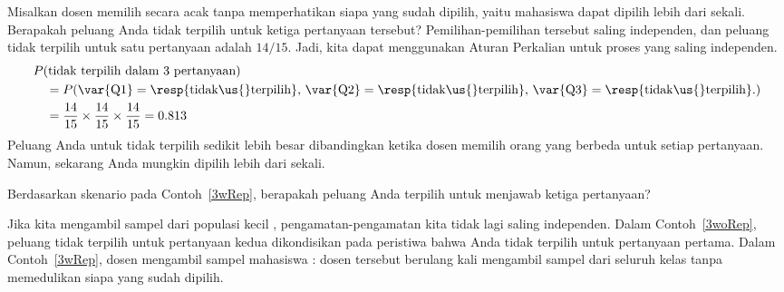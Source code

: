 \D{\newpage}

\begin{examplewrap}
\begin{nexample}{Misalkan dosen memilih secara acak tanpa memperhatikan siapa yang sudah dipilih, yaitu mahasiswa dapat dipilih lebih dari sekali. Berapakah peluang Anda tidak terpilih untuk ketiga pertanyaan tersebut?}\label{3wRep}
Pemilihan-pemilihan tersebut saling independen, dan peluang tidak terpilih untuk satu pertanyaan adalah $14/15$. Jadi, kita dapat menggunakan Aturan Perkalian untuk proses yang saling independen.
\begin{align*}
&P(\text{tidak terpilih dalam 3 pertanyaan}) \\
&\quad = P(\text{\var{Q1}} = \text{\resp{tidak\us{}terpilih}, }\text{\var{Q2}} = \text{\resp{tidak\us{}terpilih}, }\text{\var{Q3}} = \text{\resp{tidak\us{}terpilih}.}) \\
&\quad = \frac{14}{15}\times\frac{14}{15}\times\frac{14}{15} = 0.813
\end{align*}
Peluang Anda untuk tidak terpilih sedikit lebih besar dibandingkan ketika dosen memilih orang yang berbeda untuk setiap pertanyaan. Namun, sekarang Anda mungkin dipilih lebih dari sekali.
\end{nexample}
\end{examplewrap}

\begin{exercisewrap}
\begin{nexercise}
Berdasarkan skenario pada Contoh~\ref{3wRep}, berapakah peluang Anda terpilih untuk menjawab ketiga pertanyaan?\footnotemark
\end{nexercise}
\end{exercisewrap}

Jika kita mengambil sampel dari populasi kecil , pengamatan-pengamatan kita tidak lagi saling independen. Dalam Contoh~\ref{3woRep}, peluang tidak terpilih untuk pertanyaan kedua dikondisikan pada peristiwa bahwa Anda tidak terpilih untuk pertanyaan pertama. Dalam Contoh~\ref{3wRep}, dosen mengambil sampel mahasiswa : dosen tersebut berulang kali mengambil sampel dari seluruh kelas tanpa memedulikan siapa yang sudah dipilih. 


